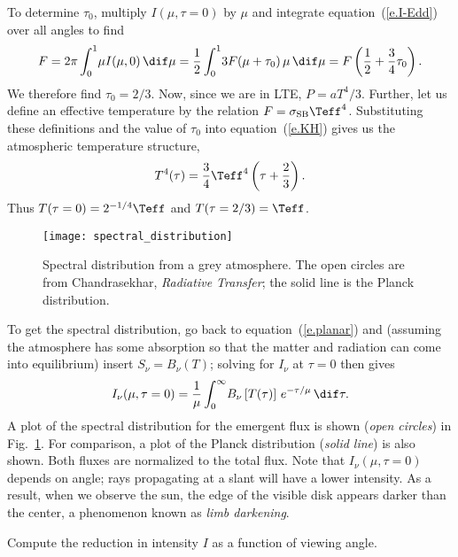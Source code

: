 To determine $\tau_{0}$, multiply $I(\mu,\tau = 0)$ by $\mu$ and integrate equation~(\ref{e.I-Edd}) over all angles to find
\begin{equation}
F = 2\pi\int_{0}^{1}\!\mu I(\mu,0)\,\dif\mu = \frac{1}{2}\int_{0}^{1}\!3F(\mu + \tau_{0})\,\mu\,\dif\mu = F\left(\frac{1}{2} + \frac{3}{4}\tau_{0}\right).
\end{equation}
We therefore find $\tau_{0} = 2/3$. Now, since we are in LTE, $P = aT^{4}/3$. Further, let us define an effective temperature by the relation $F = \ssb\Teff^{4}$.  Substituting these definitions and the value of $\tau_{0}$ into equation~(\ref{e.KH}) gives us the atmospheric temperature structure,
\begin{equation}\label{e.Eddington}
T^{4}(\tau) = \frac{3}{4}\Teff^{4}\left(\tau + \frac{2}{3}\right).
\end{equation}
Thus $T(\tau  = 0) = 2^{-1/4} \Teff$ and $T(\tau = 2/3) = \Teff$.  

\begin{figure}[htbp]
\texttt{[image: spectral\_distribution]}
\caption[Spectral distribution from a grey atmosphere.]{\label{f.spectral} Spectral distribution from a grey atmosphere. The open circles are from Chandrasekhar, \emph{Radiative Transfer}; the solid line is the Planck distribution.}
\end{figure}

To get the spectral distribution, go back to equation~(\ref{e.planar}) and (assuming the atmosphere has some absorption so that the matter and radiation can come into equilibrium) insert $S_{\nu} = B_{\nu}(T)$; solving for $I_{\nu}$ at $\tau = 0$ then gives
\begin{equation}\label{e.spectral}
I_{\nu}(\mu,\tau=0) = \frac{1}{\mu}\int_{0}^{\infty}\!B_{\nu}\left[T(\tau)\right] \, e^{-\tau/\mu}\,\dif\tau.
\end{equation}
A plot of the spectral distribution for the emergent flux is shown (\emph{open circles}) in Fig.~\ref{f.spectral}. For comparison, a plot of the Planck distribution (\emph{solid line}) is also shown. Both fluxes are normalized to the total flux.  Note that $I_{\nu}(\mu,\tau=0)$ depends on angle; rays propagating at a slant will have a lower intensity.  As a result, when we observe the sun, the edge of the visible disk appears darker than the center, a phenomenon known as \emph{limb darkening}.

\begin{exercisebox}
Compute the reduction in intensity $I$ as a function of viewing angle.
\end{exercisebox}

